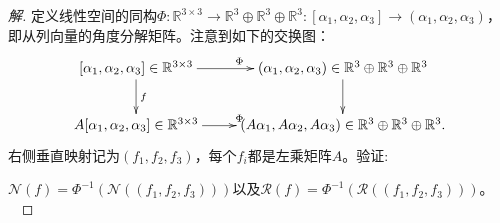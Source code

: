 \documentclass[UTF8]{ctexart}
\begin{document}
\begin{proof}[解]
定义线性空间的同构$\Phi: \mathbb{R}^{3 \times 3} \to \mathbb{R}^{3} \oplus \mathbb{R}^{3} \oplus \mathbb{R}^{3}: [\alpha_1, \alpha_2, \alpha_3] \to (\alpha_1, \alpha_2, \alpha_3)$，即从列向量的角度分解矩阵。注意到如下的交换图：
\begin{equation}
\xymatrix{
[\alpha_1, \alpha_2, \alpha_3] \in \mathbb{R}^{3 \times 3}\ar[r]^{\Phi}\ar[d]^{f}& (\alpha_1, \alpha_2, \alpha_3) \in \mathbb{R}^{3} \oplus \mathbb{R}^{3} \oplus \mathbb{R}^{3}\ar[d]\\
A[\alpha_1, \alpha_2, \alpha_3] \in \mathbb{R}^{3 \times 3}\ar[r]^{\Phi}& (A\alpha_1, A\alpha_2, A\alpha_3) \in \mathbb{R}^{3} \oplus \mathbb{R}^{3} \oplus \mathbb{R}^{3}.\\
}
\end{equation}
右侧垂直映射记为$(f_1, f_2, f_3)$，每个$f_i$都是左乘矩阵$A$。验证:
\

$\mathcal{N}(f) = \Phi^{-1}(\mathcal{N}((f_1, f_2, f_3)))$以及$\mathcal{R}(f) = \Phi^{-1}(\mathcal{R}((f_1, f_2, f_3)))$。
\


\end{proof}
\end{document}
